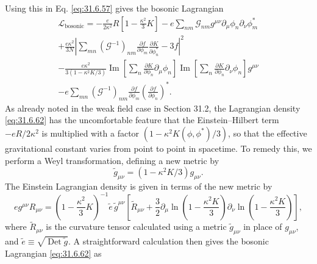 Using this in Eq. \eqref{eq:31.6.57} gives the bosonic Lagrangian
\begin{multline}
  \mathcal L_{\mathrm{bosonic}}
  =-\frac{e}{2\kappa^2}R
    \left[1-\frac{\kappa^2}{3}K\right]
  -e\sum_{nm}\mathcal G_{nm}g^{\mu\nu}
    \partial_\mu\phi_n\partial_\nu\phi_m^*\\
  +\frac{e\kappa^2}{3N}
    \left|
      \sum_{mn}(\mathcal G^{-1})_{nm}
      \frac{\partial f}{\partial\phi_m}
      \frac{\partial K}{\partial\phi_n^*}
      -3f
    \right|^2\\
  -\frac{e\kappa^2}{3(1-\kappa^2K/3)}
    \operatorname{Im}\left[
      \sum_n\frac{\partial K}{\partial\phi_n}\partial_\mu\phi_n
    \right]
    \operatorname{Im}\left[
      \sum_n\frac{\partial K}{\partial\phi_n}\partial_\nu\phi_n
    \right]g^{\mu\nu}\\
  -e\sum_{mn}(\mathcal G^{-1})_{nm}
    \frac{\partial f}{\partial\phi_m}
    \left(\frac{\partial f}{\partial\phi_n}\right)^*.
  \tag{31.6.62}\label{eq:31.6.62}
\end{multline}
As already noted in the weak field case in Section 31.2, the Lagrangian
density \eqref{eq:31.6.62} has the uncomfortable feature that the
Einstein--Hilbert term \(-eR/2\kappa^2\) is multiplied with a factor
\((1-\kappa^2K(\phi,\phi^*)/3)\), so that the effective gravitational
constant varies from point to point in spacetime. To remedy this, we
perform a Weyl transformation, defining a new metric by
\begin{equation}
  \widetilde g_{\mu\nu}
  =(1-\kappa^2K/3)g_{\mu\nu}.
  \tag{31.6.63}\label{eq:31.6.63}
\end{equation}
The Einstein Lagrangian density is given in terms of the new metric by
\[
  eg^{\mu\nu}R_{\mu\nu}
  =\left(1-\frac{\kappa^2}{3}K\right)^{-1}
    \widetilde e\,\widetilde g^{\mu\nu}
    \left[
      \widetilde R_{\mu\nu}
      +\frac{3}{2}\partial_\mu
        \ln\left(1-\frac{\kappa^2K}{3}\right)
        \partial_\nu
        \ln\left(1-\frac{\kappa^2K}{3}\right)
    \right],
\]
where \(\widetilde R_{\mu\nu}\) is the curvature tensor calculated using
a metric \(\widetilde g_{\mu\nu}\) in place of \(g_{\mu\nu}\), and
\(\widetilde e\equiv\sqrt{\operatorname{Det}\widetilde g}\). A
straightforward calculation then gives the bosonic Lagrangian
\eqref{eq:31.6.62} as
